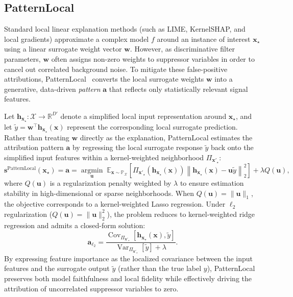 \documentclass[pdflatex,sn-mathphys-num]{sn-jnl}
\theoremstyle{thmstyleone}
\theoremstyle{thmstyletwo}%
\theoremstyle{thmstylethree}%
\begin{document}
\subsection{PatternLocal}
Standard local linear explanation methods (such as LIME, KernelSHAP, and local gradients) approximate a complex model $f$ around an instance of interest $\mathbf{x}_\star$ using a linear surrogate weight vector $\mathbf{w}$. However, as discriminative filter parameters, $\mathbf{w}$ often assigns non-zero weights to suppressor variables in order to cancel out correlated background noise. To mitigate these false-positive attributions, PatternLocal~\cite{patternlocal_citation} converts the local surrogate weights $\mathbf{w}$ into a generative, data-driven \emph{pattern} $\mathbf{a}$ that reflects only statistically relevant signal features.

Let $\mathbf{h}_{\mathbf{x}_\star}: \mathcal{X} \to \mathbb{R}^{D'}$ denote a simplified local input representation around $\mathbf{x}_\star$, and let $\tilde{y} = \mathbf{w}^\top \mathbf{h}_{\mathbf{x}_\star}(\mathbf{x})$ represent the corresponding local surrogate prediction. Rather than treating $\mathbf{w}$ directly as the explanation, PatternLocal estimates the attribution pattern $\mathbf{a}$ by regressing the local surrogate response $\tilde{y}$ back onto the simplified input features within a kernel-weighted neighborhood $\Pi_{\mathbf{x}'_\star}$:
\begin{equation}
    \mathbf{s}^{\text{PatternLocal}}(\mathbf{x}_\star) = \mathbf{a} = \operatorname*{argmin}_{\mathbf{u}} \; \mathbb{E}_{\mathbf{x} \sim \mathbb{P}_{\mathcal{X}}} \left[ \Pi_{\mathbf{x}'_\star}(\mathbf{h}_{\mathbf{x}_\star}(\mathbf{x})) \left\| \mathbf{h}_{\mathbf{x}_\star}(\mathbf{x}) - \mathbf{u}\tilde{y} \right\|_2^2 \right] + \lambda Q(\mathbf{u}),
    \label{eq:pl_objective}
\end{equation}
where $Q(\mathbf{u})$ is a regularization penalty weighted by $\lambda$ to ensure estimation stability in high-dimensional or sparse neighborhoods. When $Q(\mathbf{u}) = \|\mathbf{u}\|_1$, the objective corresponds to a kernel-weighted Lasso regression. Under $\ell_2$ regularization ($Q(\mathbf{u}) = \|\mathbf{u}\|_2^2$), the problem reduces to kernel-weighted ridge regression and admits a closed-form solution:
\begin{equation}
    \mathbf{a}_{\ell_2} = \frac{\operatorname{Cov}_{\Pi_{\mathbf{x}'_\star}}[\mathbf{h}_{\mathbf{x}_\star}(\mathbf{x}), \tilde{y}]}{\operatorname{Var}_{\Pi_{\mathbf{x}'_\star}}[\tilde{y}] + \lambda}.
    \label{eq:pl_closed}
\end{equation}
By expressing feature importance as the localized covariance between the input features and the surrogate output $\tilde{y}$ (rather than the true label $y$), PatternLocal preserves both model faithfulness and local fidelity while effectively driving the attribution of uncorrelated suppressor variables to zero.
\end{document}
